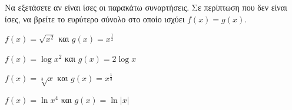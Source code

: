 Να εξετάσετε αν είναι ίσες οι παρακάτω συναρτήσεις. Σε περίπτωση που δεν είναι ίσες, να βρείτε το ευρύτερο σύνολο στο οποίο ισχύει $ f(x)=g(x) $.
\begin{alist}
\item $ f(x)=\sqrt{x^2} $ και $ g(x)=x^{\frac{1}{2}} $
\item $ f(x)=\log{x^2} $ και $ g(x)=2\log{x} $
\item $ f(x)=\sqrt[3]{x} $ και $ g(x)=x^{\frac{1}{3}} $
\item $ f(x)=\ln{x^4} $ και $ g(x)=\ln{|x|} $
\end{alist}
